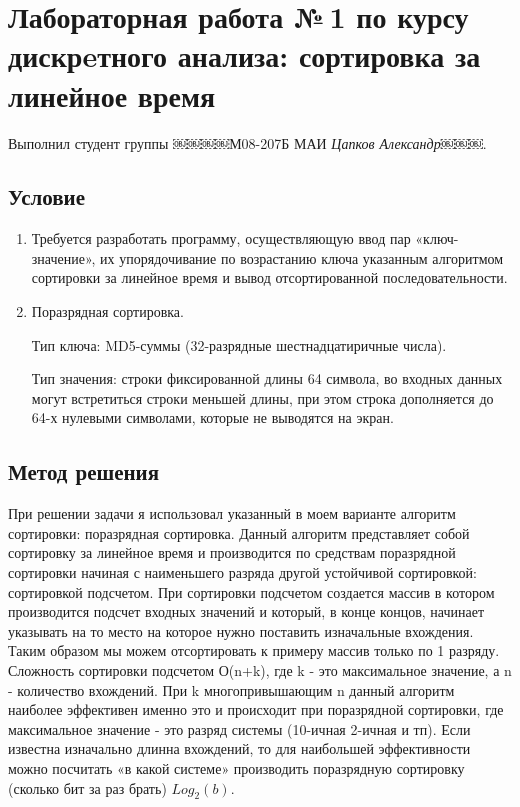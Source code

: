 \documentclass[12pt]{article}
\begin{document}
\section*{Лабораторная работа №\,1 по курсу дискрeтного анализа: сортировка за линейное время}

Выполнил студент группы ￼￼￼￼М08-207Б МАИ \textit{Цапков Александр￼￼￼}.

\subsection*{Условие}

\begin{enumerate}
\item Требуется разработать программу, осуществляющую ввод пар «ключ-значение»,
 их упорядочивание по возрастанию ключа указанным алгоритмом сортировки за линейное
 время и вывод отсортированной последовательности.
\item Поразрядная сортировка.

Тип ключа: MD5-суммы (32-разрядные шестнадцатиричные числа).

Тип значения: строки фиксированной длины 64 символа, во входных данных могут встретиться строки меньшей длины, при этом строка дополняется до 64-х нулевыми символами, которые не выводятся на экран.

 
\end{enumerate}

\subsection*{Метод решения}

При решении задачи я использовал указанный в моем варианте алгоритм сортировки: поразрядная сортировка. Данный алгоритм представляет собой сортировку за линейное время и производится по средствам поразрядной сортировки начиная с наименьшего разряда другой устойчивой сортировкой: сортировкой подсчетом. При сортировки подсчетом создается массив в котором производится подсчет входных значений и который, в конце концов, начинает указывать на то место на которое нужно поставить изначальные вхождения. Таким образом мы можем отсортировать к примеру массив только по 1 разряду.  Сложность сортировки подсчетом О(n+k), где k -  это максимальное значение, а n - количество вхождений. При k многопривышающим n данный алгоритм наиболее эффективен именно это и происходит при поразрядной сортировки, где максимальное значение - это разряд системы (10-ичная 2-ичная и тп). Если известна изначально длинна вхождений, то для наибольшей эффективности можно посчитать «в какой системе» производить поразрядную сортировку (сколько бит за раз брать) $Log_2 (b)$.
\end{document}
